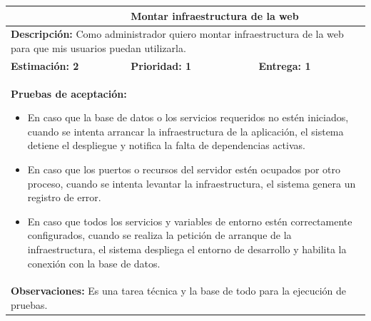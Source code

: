 \begin{table}[H]
\centering
{}
\begin{tabularx}{\textwidth}{|X|X|X|}
\hline
\rowcolor{azulclaro}
\multicolumn{1}{|l|}{\textbf{Identificador:} HUT-A0} & \multicolumn{2}{l|}{\textbf{Montar infraestructura de la web}} \\ \hline
\multicolumn{3}{|p{\dimexpr\textwidth-2\tabcolsep-2\arrayrulewidth}|}{\textbf{Descripción:} Como administrador quiero montar infraestructura de la web para que mis usuarios puedan utilizarla.} \\ \hline
\rowcolor{white}
\textbf{Estimación: 2} & \textbf{Prioridad: 1} & \textbf{Entrega: 1} \\ \hline
\multicolumn{3}{|p{\dimexpr\textwidth-2\tabcolsep-2\arrayrulewidth}|}{%
\textbf{Pruebas de aceptación:}
\begin{itemize}[leftmargin=1.5em, itemsep=2pt, topsep=3pt]
    \item En caso que la base de datos o los servicios requeridos no estén iniciados, cuando se intenta arrancar la infraestructura de la aplicación, el sistema detiene el despliegue y notifica la falta de dependencias activas.
    \item En caso que los puertos o recursos del servidor estén ocupados por otro proceso, cuando se intenta levantar la infraestructura, el sistema genera un registro de error.
    \item En caso que todos los servicios y variables de entorno estén correctamente configurados, cuando se realiza la petición de arranque de la infraestructura, el sistema despliega el entorno de desarrollo y habilita la conexión con la base de datos.
\end{itemize}
} \\ \hline
\multicolumn{3}{|p{\dimexpr\textwidth-2\tabcolsep-2\arrayrulewidth}|}{\textbf{Observaciones:} Es una tarea técnica y la base de todo para la ejecución de pruebas.} \\ \hline
\end{tabularx}
\end{table}

\vspace{0.4cm}

